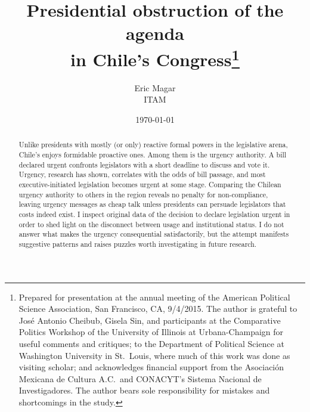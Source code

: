\documentclass[letter,12pt]{article}
\begin{document}
\title{Presidential obstruction of the agenda \\in Chile's Congress\thanks{Prepared for presentation at the annual meeting of the American Political Science Association, San Francisco, CA, 9/4/2015. The author is grateful to Jos\'e Antonio Cheibub, Gisela Sin, and participants at the Comparative Politics Workshop of the University of Illinois at Urbana-Champaign for useful comments and critiques; to the Department of Political Science at Washington University in St.\ Louis, where much of this work was done as visiting scholar; and acknowledges financial support from the Asociaci\'on Mexicana de Cultura A.C.\ and CONACYT's Sistema Nacional de Investigadores. The author bears sole responsibility for mistakes and shortcomings in the study.}}
\author{Eric Magar \\ ITAM }
\date{\today}
\maketitle


\begin{abstract}
\noindent Unlike presidents with mostly (or only) reactive formal powers in the legislative arena, Chile's enjoys formidable proactive ones. Among them is the urgency authority. A bill declared urgent confronts legislators with a short deadline to discuss and vote it. Urgency, research has shown, correlates with the odds of bill passage, and most executive-initiated legislation becomes urgent at some stage. Comparing the Chilean urgency authority to others in the region reveals no penalty for non-compliance, leaving urgency messages as cheap talk unless presidents can persuade legislators that costs indeed exist. I inspect original data of the decision to declare legislation urgent in order to shed light on the disconnect between usage and institutional status. I do not answer what makes the urgency consequential satisfactorily, but the attempt manifests suggestive patterns and raises puzzles worth investigating in future research. 
\end{abstract}

\end{document}
